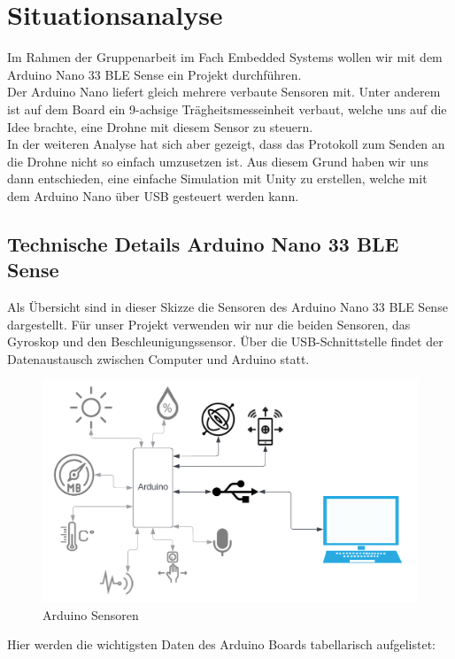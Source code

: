 \section{Situationsanalyse}

Im Rahmen der Gruppenarbeit im Fach Embedded Systems wollen wir mit dem Arduino Nano 33 BLE Sense ein Projekt durchführen.\\
Der Arduino Nano liefert gleich mehrere verbaute Sensoren mit. Unter anderem ist auf dem Board ein 9-achsige Trägheitsmesseinheit verbaut, welche uns auf die Idee brachte, eine Drohne mit diesem Sensor zu steuern.\\
In der weiteren Analyse hat sich aber gezeigt, dass das Protokoll zum Senden an die Drohne nicht so einfach umzusetzen ist. Aus diesem Grund haben wir uns dann entschieden, eine einfache Simulation mit Unity zu erstellen, welche mit dem Arduino Nano über USB gesteuert werden kann.

\subsection{Technische Details Arduino Nano 33 BLE Sense}
Als Übersicht sind in dieser Skizze die Sensoren des Arduino Nano 33 BLE Sense dargestellt. Für unser Projekt verwenden wir nur die beiden Sensoren, das Gyroskop und den Beschleunigungssensor. Über die USB-Schnittstelle findet der Datenaustausch zwischen Computer und Arduino statt.


\begin{figure}[H]
  \begin{center}
    \includegraphics[width=0.6\linewidth]{content/images/system.png}
    \caption{Arduino Sensoren}
  \end{center}
\end{figure}

\newpage
Hier werden die wichtigsten Daten des Arduino Boards tabellarisch aufgelistet:

